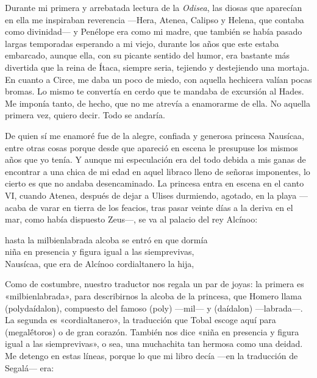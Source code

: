 \label{cap:nausicaa}

Durante mi primera y arrebatada lectura de la \emph{Odisea}, las diosas que aparecían en ella me inspiraban reverencia ---Hera, Atenea, Calipso y Helena, que contaba como divinidad--- y Penélope era como mi madre, que también se había pasado largas temporadas esperando a mi viejo, durante los años que este estaba embarcado, aunque ella, con su picante sentido del humor, era bastante más divertida que la reina de Ítaca, siempre seria, tejiendo y destejiendo una mortaja. En cuanto a Circe, me daba un poco de miedo, con aquella hechicera valían pocas bromas. Lo mismo te convertía en cerdo que te mandaba de excursión al Hades. Me imponía tanto, de hecho, que no me atrevía a enamorarme de ella. No aquella primera vez, quiero decir. Todo se andaría.

De quien sí me enamoré fue de la alegre, confiada y generosa princesa Nausícaa, entre otras cosas porque desde que apareció en escena le presupuse los mismos años que yo tenía. Y aunque mi especulación era del todo debida a mis ganas de encontrar a una chica de mi edad en aquel libraco lleno de señoras imponentes, lo cierto es que no andaba desencaminado. La princesa entra en escena en el canto VI, cuando Atenea, después de dejar a Ulises durmiendo, agotado, en la playa ---acaba de varar en tierra de los feacios, tras pasar veinte días a la deriva en el mar, como había dispuesto Zeus---, se va al palacio del rey Alcínoo:

\begin{versocita}
hasta la milbienlabrada alcoba se entró en que dormía\\
niña en presencia y figura igual a las siemprevivas,\\
Nausícaa, que era de Alcínoo cordialtanero la hija,
\end{versocita}

Como de costumbre, nuestro traductor nos regala un par de joyas: la primera es «milbienlabrada», para describirnos la alcoba de la princesa, que Homero llama  (polydaídalon), compuesto del famoso  (poly) ---mil--- y  (daídalon) ---labrada---. La segunda es «cordialtanero», la traducción que Tobal escoge aquí para  (megalḗtoros) o de gran corazón. También nos dice «niña en presencia y figura igual a las siemprevivas», o sea, una muchachita tan hermosa como una deidad. Me detengo en estas líneas, porque lo que mi libro decía ---en la traducción de Segalá--- era:

